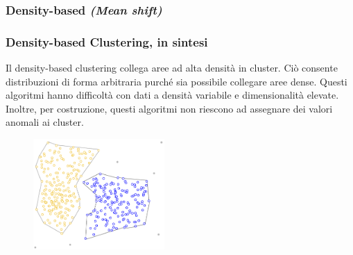 
\subsubsection[Density-based (Mean shift)]{Density-based \textit{(Mean shift)}}
\begin{frame}

	\frametitle{{\color{GradientDescentDiagramRed}Density-based Clustering}, in sintesi}

		Il density-based clustering collega aree ad alta densità in cluster. Ciò consente distribuzioni di forma arbitraria purché sia possibile collegare aree dense.
		\newlinedouble
		Questi algoritmi hanno difficoltà con dati a densità variabile e dimensionalità elevate. Inoltre, per costruzione, questi algoritmi non riescono ad assegnare dei valori anomali ai cluster.
		\begin{figure}[!htbp]
			\centering
			\includegraphics[width=5.0cm]{images/unsupervised/types/Clustering_Density.pdf}
		\end{figure}

\end{frame}


